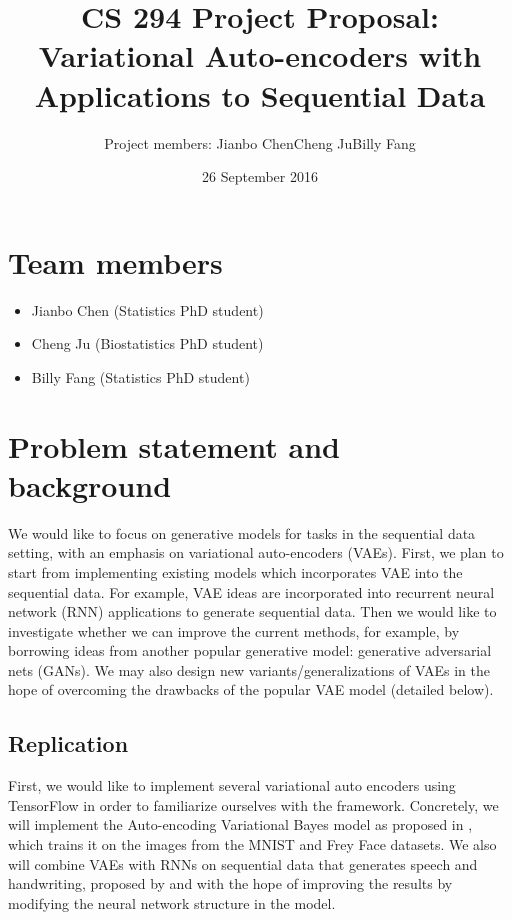 \documentclass[11pt]{article}
\title{CS 294 Project Proposal:\\Variational Auto-encoders with Applications to Sequential Data}
\date{26 September 2016}
\author{Project members: Jianbo Chen\quad Cheng Ju\quad Billy Fang}
\begin{document}
\maketitle


\section*{Team members}

\begin{itemize}
    \item Jianbo Chen (Statistics PhD student)
    \item Cheng Ju (Biostatistics PhD student)
    \item Billy Fang (Statistics PhD student)
\end{itemize}

\section*{Problem statement and background}

We would like to focus on generative models for tasks in the sequential data setting, with an emphasis on variational auto-encoders (VAEs).  First, we plan to start from implementing existing models which incorporates VAE into the sequential data. For example, VAE ideas are incorporated into recurrent neural network (RNN) applications to generate sequential data. Then we would like to investigate whether we can improve the current methods, for example, by borrowing ideas from another popular generative model:  generative adversarial nets (GANs). We may also design new variants/generalizations of VAEs in the hope of overcoming the drawbacks of the popular VAE model (detailed below).

\subsection*{Replication}

First, we would like to implement several variational auto encoders using TensorFlow in order to familiarize ourselves with the framework. Concretely, we will implement the Auto-encoding Variational Bayes model as proposed in \cite{kingma2013auto}, which trains it on the images from the MNIST and Frey Face datasets. We also will combine VAEs with RNNs on sequential data that generates speech and handwriting, proposed by \cite{gregor2015draw} and \cite{chung2015recurrent} with the hope of improving the results by modifying the neural network structure in the model.
\end{document}
